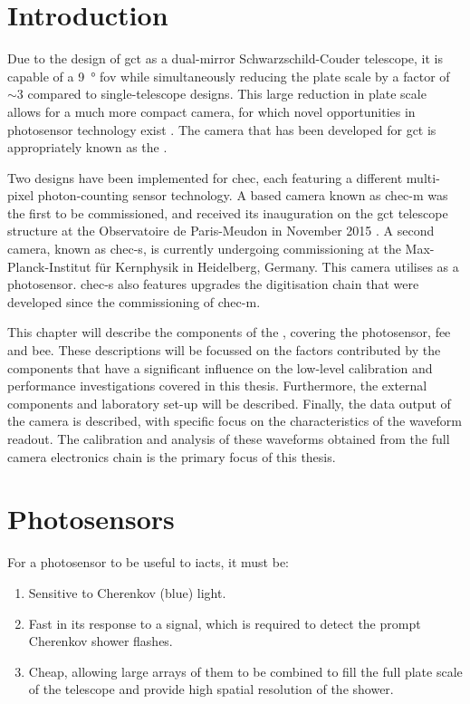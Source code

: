 \section{Introduction}

Due to the design of \gls{gct} as a dual-mirror Schwarzschild-Couder telescope, it is capable of a \SI{9}{\degree} \gls{fov}  while simultaneously reducing the plate scale by a factor of $\sim 3$ compared to single-telescope designs. This large reduction in plate scale allows for a much more compact camera, for which novel opportunities in photosensor technology exist \cite{Vassiliev2007}. The camera that has been developed for \gls{gct} is appropriately known as the .

Two designs have been implemented for \gls{chec}, each featuring a different multi-pixel photon-counting sensor technology. A  based camera known as \gls{chec-m} was the first to be commissioned, and received its inauguration on the \gls{gct} telescope structure at the Observatoire de Paris-Meudon in November 2015 \cite{Watson2017}. A second camera, known as \gls{chec-s}, is currently undergoing commissioning at the Max-Planck-Institut für Kernphysik in Heidelberg, Germany. This camera utilises  as a photosensor. \gls{chec-s} also features upgrades the digitisation chain that were developed since the commissioning of \gls{chec-m}.

This chapter will describe the components of the , covering the photosensor, \gls{fee} and \gls{bee}. These descriptions will be focussed on the factors contributed by the components that have a significant influence on the low-level calibration and performance investigations covered in this thesis. Furthermore, the external components and laboratory set-up will be described. Finally, the data output of the camera is described, with specific focus on the characteristics of the waveform readout. The calibration and analysis of these waveforms obtained from the full camera electronics chain is the primary focus of this thesis.

\section{Photosensors}

For a photosensor to be useful to \glspl{iact}, it must be:
\begin{enumerate}
\item Sensitive to Cherenkov (blue) light.
\item Fast in its response to a signal, which is required to detect the prompt Cherenkov shower flashes.
\item Cheap, allowing large arrays of them to be combined to fill the full plate scale of the telescope and provide high spatial resolution of the shower.
\end{enumerate}

